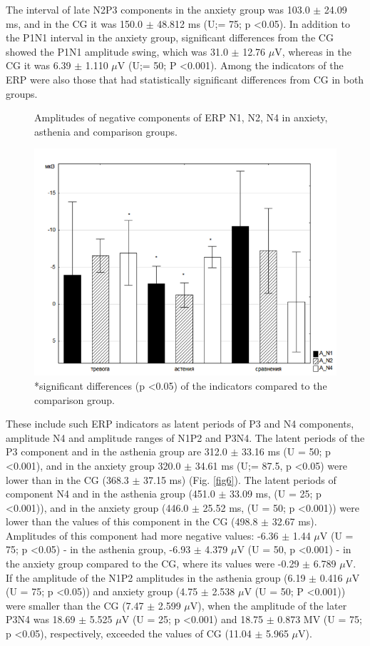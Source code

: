 \documentclass[twocolumn]{article}
\begin{document}
\par The interval of late N2P3 components in the anxiety group was 103.0 $\pm$ 24.09 ms, and in the CG it was 150.0 $\pm$ 48.812 ms (U\cite{bib15};\cite{bib20}= 75; p \textless{}0.05). In addition to the P1N1 interval in the anxiety group, significant differences from the CG showed the  P1N1 amplitude swing, which was 31.0 $\pm$ 12.76 $\mu$V, whereas in the CG it was 6.39 $\pm$ 1.110 $\mu$V (U\cite{bib15};\cite{bib20}= 50; P \textless{}0.001). Among the indicators of the ERP were also those that had statistically significant differences from CG in both groups.
\begin{figure}
\caption{Amplitudes of negative components of ERP N1, N2, N4 in anxiety, asthenia and comparison groups.}
\label{fig5}
\includegraphics[width=\linewidth ]{fig5.png}
\caption*{*significant differences (p \textless{}0.05) of the indicators compared to the comparison group.}
\end{figure}
\par These include such ERP indicators as latent periods of P3 and N4 components, amplitude N4 and amplitude ranges of N1P2 and P3N4. The latent periods of the P3 component and in the asthenia group are 312.0 $\pm$ 33.16 ms (U = 50; p \textless{}0.001), and in the anxiety group 320.0 $\pm$ 34.61 ms (U\cite{bib15};\cite{bib20}= 87.5, p \textless{}0.05) were lower than in the CG (368.3 $\pm$ 37.15 ms) (Fig. \ref{fig6}). The latent periods of component N4 and in the asthenia group (451.0 $\pm$ 33.09 ms, (U = 25; p \textless{}0.001)), and in the anxiety group (446.0 $\pm$ 25.52 ms, (U = 50; p \textless{}0.001)) were lower than the values of this component in the CG (498.8 $\pm$ 32.67 ms). Amplitudes of this component had more negative values: -6.36 $\pm$ 1.44 $\mu$V (U = 75; p \textless{}0.05) - in the asthenia group, -6.93 $\pm$ 4.379 $\mu$V (U = 50, p \textless{}0.001) - in the anxiety group compared to the CG, where its values were -0.29 $\pm$ 6.789 $\mu$V. If the amplitude of the N1P2 amplitudes in the asthenia group (6.19 $\pm$ 0.416 $\mu$V (U = 75; p \textless{}0.05)) and anxiety group (4.75 $\pm$ 2.538 $\mu$V (U = 50; P \textless{}0.001)) were smaller than the CG (7.47 $\pm$ 2.599 $\mu$V), when the amplitude of the later P3N4 was 18.69 $\pm$ 5.525 $\mu$V (U = 25; p \textless{}0.001) and 18.75 $\pm$ 0.873 MV (U = 75; p \textless{}0.05), respectively, exceeded the values of CG (11.04 $\pm$ 5.965 $\mu$V).
\end{document}
